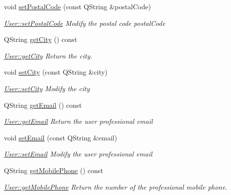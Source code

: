 \begin{DoxyCompactItemize}
void \hyperlink{classModels_1_1User_a5a75307bb95eae0970efd282519ec5ba}{set\-Postal\-Code} (const Q\-String \&postal\-Code)
\begin{DoxyCompactList}\small\item\em \hyperlink{classModels_1_1User_a5a75307bb95eae0970efd282519ec5ba}{User\-::set\-Postal\-Code} Modify the postal code {\itshape postal\-Code} \end{DoxyCompactList}\item 
Q\-String \hyperlink{classModels_1_1User_a6ee95d68097373de6273bd0386f2dff1}{get\-City} () const 
\begin{DoxyCompactList}\small\item\em \hyperlink{classModels_1_1User_a6ee95d68097373de6273bd0386f2dff1}{User\-::get\-City} Return the city. \end{DoxyCompactList}\item 
void \hyperlink{classModels_1_1User_a98c035e4275b8170bec888bea05b24d9}{set\-City} (const Q\-String \&city)
\begin{DoxyCompactList}\small\item\em \hyperlink{classModels_1_1User_a98c035e4275b8170bec888bea05b24d9}{User\-::set\-City} Modify the {\itshape city} \end{DoxyCompactList}\item 
Q\-String \hyperlink{classModels_1_1User_a90b1f27762a58bbe2e903d8299678b74}{get\-Email} () const 
\begin{DoxyCompactList}\small\item\em \hyperlink{classModels_1_1User_a90b1f27762a58bbe2e903d8299678b74}{User\-::get\-Email} Return the user professional {\itshape email} \end{DoxyCompactList}\item 
void \hyperlink{classModels_1_1User_a69fc70b244bccf493df300af812a18c3}{set\-Email} (const Q\-String \&email)
\begin{DoxyCompactList}\small\item\em \hyperlink{classModels_1_1User_a69fc70b244bccf493df300af812a18c3}{User\-::set\-Email} Modify the user professional {\itshape email} \end{DoxyCompactList}\item 
Q\-String \hyperlink{classModels_1_1User_aba9d318cad6935104eff02f6b5659d5c}{get\-Mobile\-Phone} () const 
\begin{DoxyCompactList}\small\item\em \hyperlink{classModels_1_1User_aba9d318cad6935104eff02f6b5659d5c}{User\-::get\-Mobile\-Phone} Return the number of the professional mobile phone. \end{DoxyCompactList}\item 

\end{DoxyCompactItemize}
